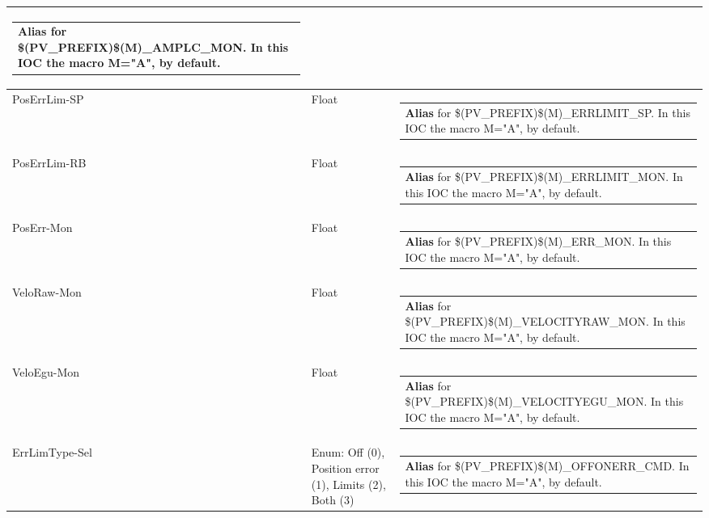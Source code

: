 \documentclass[openany]{article}
\begin{document}
\begin{longtable}{| m{4.5cm} m{2.5cm}  m{8.5cm} |}
\begin{tabular}{@{}m{6cm}@{}}
                \textbf{\color{blue} Alias} for \$(PV\_PREFIX)\$(M)\_AMPLC\_MON. In this IOC the macro M="A", by default.
            \end{tabular} \hypertarget{pv:pos-err-lim}{}\\ \hline
        PosErrLim-SP & Float & \begin{tabular}{@{}m{6cm}@{}}
                \textbf{\color{blue} Alias} for \$(PV\_PREFIX)\$(M)\_ERRLIMIT\_SP. In this IOC the macro M="A", by default.
            \end{tabular} \hypertarget{}{}\\ \hline
        PosErrLim-RB & Float & \begin{tabular}{@{}m{6cm}@{}}
                \textbf{\color{blue} Alias} for \$(PV\_PREFIX)\$(M)\_ERRLIMIT\_MON. In this IOC the macro M="A", by default.
            \end{tabular} \hypertarget{pv:pos-err-mon}{}\\ \hline
        PosErr-Mon & Float & \begin{tabular}{@{}m{6cm}@{}}
                \textbf{\color{blue} Alias} for \$(PV\_PREFIX)\$(M)\_ERR\_MON. In this IOC the macro M="A", by default.
            \end{tabular} \hypertarget{pv:velo-raw-mon}{}\\ \hline
        VeloRaw-Mon & Float & \begin{tabular}{@{}m{6cm}@{}}
                \textbf{\color{blue} Alias} for \$(PV\_PREFIX)\$(M)\_VELOCITYRAW\_MON. In this IOC the macro M="A", by default.
            \end{tabular} \hypertarget{pv:velo-egu-mon}{}\\ \hline
        VeloEgu-Mon & Float & \begin{tabular}{@{}m{6cm}@{}}
                \textbf{\color{blue} Alias} for \$(PV\_PREFIX)\$(M)\_VELOCITYEGU\_MON. In this IOC the macro M="A", by default.
            \end{tabular} \hypertarget{pv:err-lim-type}{}\\ \hline
        ErrLimType-Sel & Enum: Off (0), Position error (1), Limits (2), Both (3) & \begin{tabular}{@{}m{6cm}@{}}
                \textbf{\color{blue} Alias} for \$(PV\_PREFIX)\$(M)\_OFFONERR\_CMD. In this IOC the macro M="A", by default.
            \end{tabular} \hypertarget{}{}\\ \hline

\end{longtable}
\end{document}
